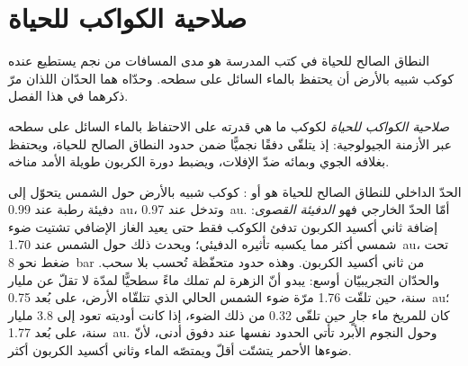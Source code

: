 \section{صلاحية الكواكب للحياة}\label{sec:b3:planetary-atmospheres:habitability}

النطاق الصالح للحياة في كتب المدرسة هو مدى المسافات من
نجم يستطيع عنده كوكب شبيه بالأرض أن يحتفظ بالماء السائل على
سطحه. وحدّاه هما الحدّان اللذان مرّ ذكرهما في هذا الفصل.

\begin{definition}\label{def:b3:planetary-atmospheres:habitability}
\emph{صلاحية الكواكب للحياة} لكوكب ما
هي قدرته على الاحتفاظ بالماء السائل على سطحه عبر
الأزمنة الجيولوجية: إذ يتلقّى دفقًا نجميًّا ضمن حدود
النطاق الصالح للحياة، ويحتفظ بغلافه الجوي وبمائه ضدّ
الإفلات، ويضبط دورة الكربون طويلة الأمد مناخه.
\end{definition}

الحدّ الداخلي للنطاق الصالح للحياة هو  أو : كوكب شبيه بالأرض حول الشمس يتحوّل إلى دفيئة رطبة عند
\qty{0.99}{au}، وتدخل  عند \qty{0.97}{au}. أمّا الحدّ الخارجي فهو
\emph{الدفيئة القصوى}: إضافة ثاني أكسيد الكربون تدفئ الكوكب فقط حتى
يعيد الغاز الإضافي تشتيت ضوء شمسي أكثر مما يكسبه تأثيره
الدفيئي؛ ويحدث ذلك حول الشمس عند
\qty{1.70}{au}، تحت ضغط نحو \qty{8}{bar} من ثاني أكسيد الكربون. وهذه
حدود متحفّظة تُحسب بلا سحب. والحدّان التجريبيّان أوسع:
يبدو أنّ الزهرة لم تملك ماءً سطحيًّا لمدّة لا تقلّ عن مليار سنة،
حين تلقّت 1.76 مرّة ضوء الشمس الحالي الذي تتلقّاه الأرض، على بُعد \qty{0.75}{au}؛
كان للمريخ ماء جارٍ حين تلقّى 0.32 من ذلك الضوء، إذا كانت
أوديته تعود إلى 3.8 مليار سنة، على بُعد \qty{1.77}{au}. وحول النجوم الأبرد تأتي الحدود نفسها
عند دفوق أدنى، لأنّ ضوءها الأحمر يتشتّت أقلّ ويمتصّه الماء وثاني أكسيد
الكربون أكثر.

